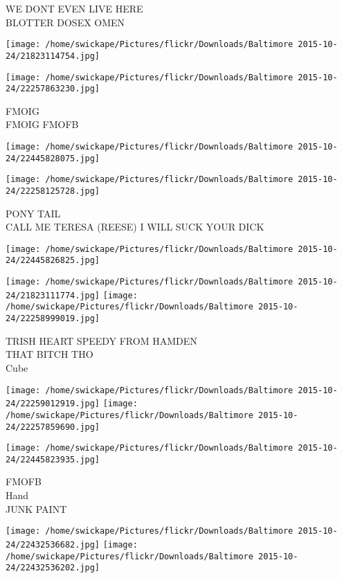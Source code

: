 \documentclass[10pt,letterpaper]{article}
\begin{document}
WE DONT EVEN LIVE HERE\\
BLOTTER DOSEX OMEN
\pagebreak

\texttt{[image: /home/swickape/Pictures/flickr/Downloads/Baltimore 2015-10-24/21823114754.jpg]}

\vspace{0.25in}
\texttt{[image: /home/swickape/Pictures/flickr/Downloads/Baltimore 2015-10-24/22257863230.jpg]}

FMOIG\\
FMOIG FMOFB
\pagebreak

\texttt{[image: /home/swickape/Pictures/flickr/Downloads/Baltimore 2015-10-24/22445828075.jpg]}

\vspace{0.25in}
\texttt{[image: /home/swickape/Pictures/flickr/Downloads/Baltimore 2015-10-24/22258125728.jpg]}

PONY TAIL\\
CALL ME TERESA (REESE) I WILL SUCK YOUR DICK
\pagebreak

\texttt{[image: /home/swickape/Pictures/flickr/Downloads/Baltimore 2015-10-24/22445826825.jpg]}

\vspace{0.25in}
\texttt{[image: /home/swickape/Pictures/flickr/Downloads/Baltimore 2015-10-24/21823111774.jpg]}
\texttt{[image: /home/swickape/Pictures/flickr/Downloads/Baltimore 2015-10-24/22258999019.jpg]}

TRISH HEART SPEEDY FROM HAMDEN\\
THAT BITCH THO\\
Cube
\pagebreak

\texttt{[image: /home/swickape/Pictures/flickr/Downloads/Baltimore 2015-10-24/22259012919.jpg]}
\texttt{[image: /home/swickape/Pictures/flickr/Downloads/Baltimore 2015-10-24/22257859690.jpg]}

\vspace{0.25in}
\texttt{[image: /home/swickape/Pictures/flickr/Downloads/Baltimore 2015-10-24/22445823935.jpg]}

FMOFB\\
Hand\\
JUNK PAINT
\pagebreak

\texttt{[image: /home/swickape/Pictures/flickr/Downloads/Baltimore 2015-10-24/22432536682.jpg]}
\texttt{[image: /home/swickape/Pictures/flickr/Downloads/Baltimore 2015-10-24/22432536202.jpg]}
\end{document}
